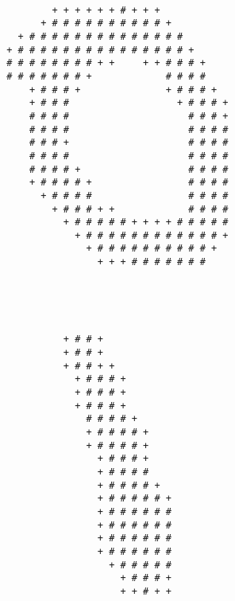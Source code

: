 \begin{multicols*}{2}
\begin{Verbatim}[samepage=true]
                                                        
                + + + + + + # + + +                     
              + # # # # # # # # # # +                   
          + # # # # # # # # # # # # # #                 
        + # # # # # # # # # # # # # # # +               
        # # # # # # # # + +     + + # # # +             
        # # # # # # # +             # # # #             
            + # # # +               + # # # +           
            + # # #                   + # # # +         
            # # # #                     # # # +         
            # # # #                     # # # #         
            # # # +                     # # # #         
            # # # #                     # # # #         
            # # # # +                   # # # #         
            + # # # # +                 # # # #         
              + # # # #                 # # # #         
                + # # # + +             # # # #         
                  + # # # # # + + + + # # # # #         
                    + # # # # # # # # # # # # +         
                      + # # # # # # # # # # +           
                        + + + # # # # # # #             
                                                        
                                                        
\end{Verbatim}
\begin{Verbatim}[samepage=true]
                                                        
                                                        
                  + # # +                               
                  + # # +                               
                  + # # + +                             
                    + # # # +                           
                    + # # # +                           
                    + # # # +                           
                      # # # # +                         
                      + # # # # +                       
                      + # # # # +                       
                        + # # # +                       
                        + # # # #                       
                        + # # # # +                     
                        + # # # # # +                   
                        + # # # # # #                   
                        + # # # # # #                   
                        + # # # # # #                   
                        + # # # # # #                   
                          + # # # # #                   
                            + # # # +                   
                            + + # + +                   
                                                        

\end{Verbatim}
\end{multicols*}

